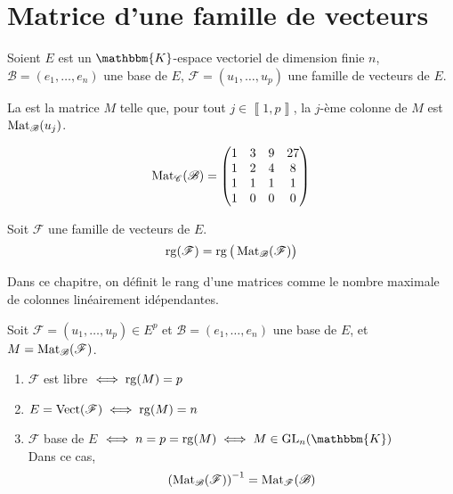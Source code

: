 \part{Matrice d'une famille de vecteurs}

Soient $E$ est un $\mathbbm{K}$-espace vectoriel de dimension finie $n$, $\mathcal{B} = (e_1, \ldots, e_n)$ une base de $E$, $\mathcal{F} = (u_1, \ldots, u_p)$ une famille de vecteurs de $E$.\\
\vspace{5mm}

\begin{defn}
	La  est la matrice $M$ telle que, pour tout $j \in \left\llbracket 1,p \right\rrbracket$, la $j$-ème colonne de $M$ est $\operatorname{Mat}_\mathcal{B}(u_j)$.
\end{defn}

\begin{exm}
	\[
		\operatorname{Mat}_\mathcal{C}(\mathcal{B}) = \begin{pmatrix}
			1&3&9&27\\
			1&2&4&8\\
			1&1&1&1\\
			1&0&0&0
		\end{pmatrix}
	\]
\end{exm}

\begin{prop}
	Soit $\mathcal{F}$ une famille de vecteurs de $E$. \[
		\operatorname{rg}(\mathcal{F}) = \operatorname{rg}\big(\operatorname{Mat}_{\mathcal{B}}(\mathcal{F})\big)
	\]
\end{prop}

\begin{prv}
	Dans ce chapitre, on définit le rang d'une matrices comme le nombre maximale de colonnes linéairement idépendantes.
\end{prv}

\begin{crlr}
	Soit $\mathcal{F} = (u_1, \ldots, u_p) \in E^p$ et $\mathcal{B} = (e_1, \ldots, e_n)$ une base de $E$, et $M = \operatorname{Mat}_\mathcal{B}(\mathcal{F})$.
	\begin{enumerate}
		\item $\mathcal{F}$ est libre $\iff \operatorname{rg}(M) = p$
		\item $E = \operatorname{Vect}(\mathcal{F}) \iff \operatorname{rg}(M) = n$ 
		\item $\mathcal{F}$ base de $E$ $\iff n = p = \rg(M) \iff M \in \mathrm{GL}_n(\mathbbm{K})$\\
			Dans ce cas, \[
				\left( \operatorname{Mat}_\mathcal{B}(\mathcal{F}) \right) ^{-1} = \operatorname{Mat}_{\mathcal{F}}(\mathcal{B})
			\]
	\end{enumerate}
\end{crlr}

